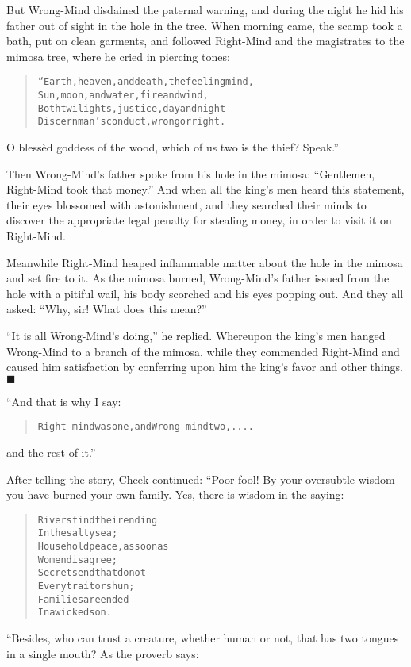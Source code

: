 \documentclass[article, twoside, 14pt]{memoir}
\newcommand{\qed}{\hfill \ensuremath{\blacksquare}}
\renewenvironment{verbatim}{%
\begin{quote}%
\vskip -10pt%
\begin{alltt}\normalfont\large}{\end{alltt}%
\end{quote}%
\vskip -10pt
} %
\begin{document}
But Wrong-Mind disdained the paternal warning, and during the night
he hid his father out of sight in the hole in the tree. When
morning came, the scamp took a bath, put on clean garments, and
followed Right-Mind and the magistrates to the mimosa tree, where
he cried in piercing tones:

\begin{verbatim}
“Earth, heaven, and death, the feeling mind,
Sun, moon, and water, fire and wind,
Both twilights, justice, day and night
Discern man's conduct, wrong or right.
\end{verbatim}
O blessèd goddess of the wood, which of us two is the thief?
Speak.”

Then Wrong-Mind's father spoke from his hole in the mimosa:
``Gentlemen, Right-Mind took that money.'' And when all the king's
men heard this statement, their eyes blossomed with
astonishment, and they searched their minds to discover the
appropriate legal penalty for stealing money, in order to visit it
on Right-Mind.

Meanwhile Right-Mind heaped inflammable matter about the hole in
the mimosa and set fire to it. As the mimosa burned, Wrong-Mind's
father issued from the hole with a pitiful wail, his body scorched
and his eyes popping out. And they all asked:
``Why, sir! What does this mean?''

``It is all Wrong-Mind's doing,'' he replied. Whereupon the king's
men hanged Wrong-Mind to a branch of the mimosa, while they
commended Right-Mind and caused him satisfaction by conferring upon
him the king's favor and other things.\hyperref[s29]{\qed}

“And that is why I say:

\begin{verbatim}
Right-mind was one, and Wrong-mind two, ....
\end{verbatim}
and the rest of it.”

After telling the story, Cheek continued: “Poor fool! By your
oversubtle wisdom you have burned your own family. Yes, there is
wisdom in the saying:

\begin{verbatim}
Rivers find their ending
    In the salty sea;
Household peace, as soon as
    Women disagree;
Secrets end that do not
    Every traitor shun;
Families are ended
    In a wicked son.
\end{verbatim}
“Besides, who can trust a creature, whether human or not, that has
two tongues in a single mouth? As the proverb says:
\end{document}
